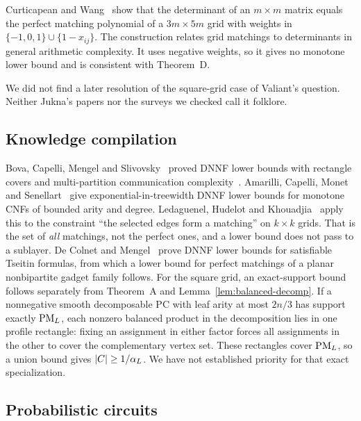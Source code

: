Curticapean and Wang~\cite{CurticapeanWang26} show that the determinant of an $m\times m$ matrix equals the perfect matching polynomial of a $3m\times5m$ grid with weights in $\{-1,0,1\}\cup\{1-x_{ij}\}$. The construction relates grid matchings to determinants in general arithmetic complexity. It uses negative weights, so it gives no monotone lower bound and is consistent with Theorem~D.

We did not find a later resolution of the square-grid case of Valiant's question. Neither Jukna's papers nor the surveys we checked call it folklore.

\subsection{Knowledge compilation}

Bova, Capelli, Mengel and Slivovsky~\cite{BovaCapelliMengelSlivovsky16} proved DNNF lower bounds with rectangle covers and multi-partition communication complexity~\cite{DurisEtAl04}. Amarilli, Capelli, Monet and Senellart~\cite{AmarilliCapelliMonetSenellart20} give exponential-in-treewidth DNNF lower bounds for monotone CNFs of bounded arity and degree. Ledaguenel, Hudelot and Khouadjia~\cite{LedaguenelEtAl25} apply this to the constraint ``the selected edges form a matching'' on $k\times k$ grids. That is the set of \emph{all} matchings, not the perfect ones, and a lower bound does not pass to a sublayer. De Colnet and Mengel~\cite{DeColnetMengelTseitin21} prove DNNF lower bounds for satisfiable Tseitin formulas, from which a lower bound for perfect matchings of a planar nonbipartite gadget family follows. For the square grid, an exact-support bound follows separately from Theorem~A and Lemma~\ref{lem:balanced-decomp}. If a nonnegative smooth decomposable PC with leaf arity at most $2n/3$ has support exactly $\mathrm{PM}_L$, each nonzero balanced product in the decomposition lies in one profile rectangle: fixing an assignment in either factor forces all assignments in the other to cover the complementary vertex set. These rectangles cover $\mathrm{PM}_L$, so a union bound gives $\lvert C\rvert\ge1/\alpha_L$. We have not established priority for that exact specialization.

\subsection{Probabilistic circuits}\label{sec:related-pc}

